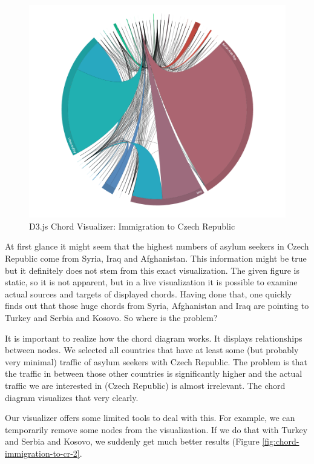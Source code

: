 \begin{figure}
	\centering
	\includegraphics[width=145mm]{img/06_chord_immigration_to_cr_1}
	\caption{D3.js Chord Visualizer: Immigration to Czech Republic}
    \label{fig:chord-immigration-to-cr-1}
\end{figure}

At first glance it might seem that the highest numbers of asylum seekers in Czech Republic come from Syria, Iraq and Afghanistan. This information might be true but it definitely does not stem from this exact visualization. The given figure is static, so it is not apparent, but in a live visualization it is possible to examine actual sources and targets of displayed chords. Having done that, one quickly finds out that those huge chords from Syria, Afghanistan and Iraq are pointing to Turkey and Serbia and Kosovo. So where is the problem?

It is important to realize how the chord diagram works. It displays relationships between nodes. We selected all countries that have at least some (but probably very minimal) traffic of asylum seekers with Czech Republic. The problem is that the traffic in between those other countries is significantly higher and the actual traffic we are interested in (Czech Republic) is almost irrelevant. The chord diagram visualizes that very clearly.

Our visualizer offers some limited tools to deal with this. For example, we can temporarily remove some nodes from the visualization. If we do that with Turkey and Serbia and Kosovo, we suddenly get much better results (Figure \ref{fig:chord-immigration-to-cr-2}.

